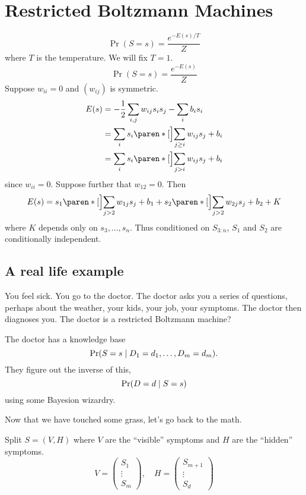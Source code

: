 \section{Restricted Boltzmann Machines} \label{sec:rbm}
\[
    \Pr(S = s) = \frac{e^{-E(s)/T}}{Z}
\] where $T$ is the temperature.
We will fix $T = 1$. \[
    \Pr(S = s) = \frac{e^{-E(s)}}{Z}
\]
Suppose $w_{ii} = 0$ and $(w_{ij})$ is symmetric.
\begin{align*}
    E(s) &= -\frac12 \sum_{i, j} w_{ij} s_i s_j - \sum_i b_i s_i \\
    &= \sum_i s_i \paren*[\Big]{\sum_{j \ge i} w_{ij} s_j + b_i} \\
    &= \sum_i s_i \paren*[\Big]{\sum_{j > i} w_{ij} s_j + b_i}
\end{align*} since $w_{i i} = 0$.
Suppose further that $w_{12} = 0$.
Then \[
    E(s) = s_1 \paren*[\Big]{\sum_{j > 2} w_{1j} s_j + b_1}
            + s_2 \paren*[\Big]{\sum_{j > 2} w_{2j} s_j + b_2}
            + K
\] where $K$ depends only on $s_3, \dots, s_n$.
Thus conditioned on $S_{3:n}$,
$S_1$ and $S_2$ are conditionally independent.

\subsection{A real life example} \label{sec:rbm:eg}
You feel sick.
You go to the doctor.
The doctor asks you a series of questions, perhaps about the weather,
your kids, your job, your symptoms.
The doctor then diagnoses you.
The doctor is a restricted Boltzmann machine?

The doctor has a knowledge base \[
    \Pr(S = s \mid D_1 = d_1, \dots, D_m = d_m).
\] They figure out the inverse of this, \[
    \Pr(D = d \mid S = s)
\] using some Bayesion wizardry.

Now that we have touched some grass, let's go back to the math.

Split $S = (V, H)$ where $V$ are the ``visible'' symptoms and $H$ are the
``hidden'' symptoms. \[
    V = \begin{pmatrix}
        S_1 \\
        \vdots \\
        S_m
    \end{pmatrix}, \quad
    H = \begin{pmatrix}
        S_{m+1} \\
        \vdots \\
        S_d
    \end{pmatrix}
\]

